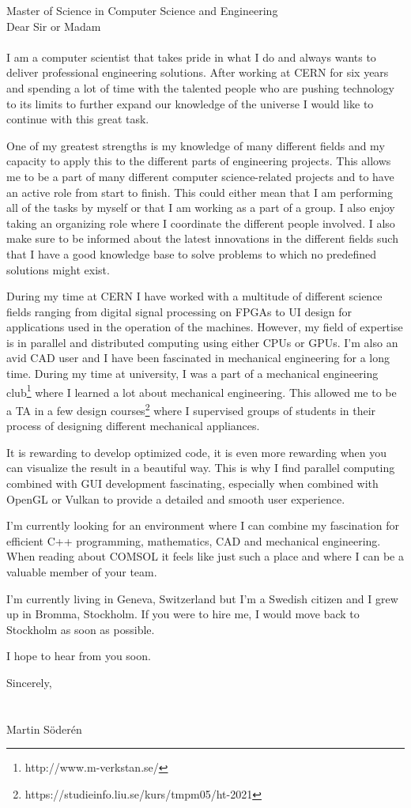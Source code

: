 \documentclass[left=2.5cm,top=2cm,right=2.5cm,bottom=2.5cm]{cv-style}
\begin{document}
       {Master of Science in Computer Science and Engineering}        %
\vspace{10mm}
\\
Dear Sir or Madam
\\
\\
I am a computer scientist that takes pride in what I do and always wants to deliver professional engineering solutions. After working at CERN for six years and spending a lot of time with the talented people who are pushing technology to its limits to further expand our knowledge of the universe I would like to continue with this great task.

One of my greatest strengths is my knowledge of many different fields and my capacity to apply this to the different parts of engineering projects. This allows me to be a part of many different computer science-related projects and to have an active role from start to finish. This could either mean that I am performing all of the tasks by myself or that I am working as a part of a group. I also enjoy taking an organizing role where I coordinate the different people involved. I also make sure to be informed about the latest innovations in the different fields such that I have a good knowledge base to solve problems to which no predefined solutions might exist.

During my time at CERN I have worked with a multitude of different science fields ranging from digital signal processing on FPGAs to UI design for applications used in the operation of the machines. However, my field of expertise is in parallel and distributed computing using either CPUs or GPUs.
I'm also an avid CAD user and I have been fascinated in mechanical engineering for a long time. During my time at university, I was a part of a mechanical engineering club\footnote{http://www.m-verkstan.se/} where I learned a lot about mechanical engineering. This allowed me to be a TA in a few design courses\footnote{https://studieinfo.liu.se/kurs/tmpm05/ht-2021} where I supervised groups of students in their process of designing different mechanical appliances.

It is rewarding to develop optimized code, it is even more rewarding when you can visualize the result in a beautiful way. This is why I find parallel computing combined with GUI development fascinating, especially when combined with OpenGL or Vulkan to provide a detailed and smooth user experience. 

I'm currently looking for an environment where I can combine my fascination for efficient C++ programming, mathematics, CAD and mechanical engineering. When reading about COMSOL it feels like just such a place and where I can be a valuable member of your team.

I'm currently living in Geneva, Switzerland but I'm a Swedish citizen and I grew up in Bromma, Stockholm. If you were to hire me, I would move back to Stockholm as soon as possible.

I hope to hear from you soon.


Sincerely,\\
\\
\\
Martin Söderén
\end{document}
